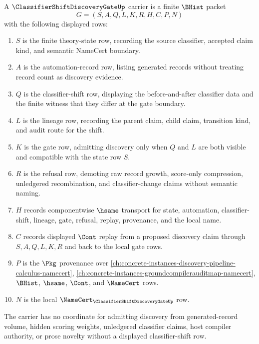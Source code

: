 \begin{definition}
\label{def:classifier-shift-discovery-gate-carrier}
A $\ClassifierShiftDiscoveryGateUp$ carrier is a finite $\BHist$ packet
$$
G=(S,A,Q,L,K,R,H,C,P,N)
$$
with the following displayed rows:
\begin{enumerate}
\item $S$ is the finite theory-state row, recording the source classifier, accepted claim kind, and semantic NameCert boundary.
\item $A$ is the automation-record row, listing generated records without treating record count as discovery evidence.
\item $Q$ is the classifier-shift row, displaying the before-and-after classifier data and the finite witness that they differ at the gate boundary.
\item $L$ is the lineage row, recording the parent claim, child claim, transition kind, and audit route for the shift.
\item $K$ is the gate row, admitting discovery only when $Q$ and $L$ are both visible and compatible with the state row $S$.
\item $R$ is the refusal row, demoting raw record growth, score-only compression, unledgered recombination, and classifier-change claims without semantic naming.
\item $H$ records componentwise $\hsame$ transport for state, automation, classifier-shift, lineage, gate, refusal, replay, provenance, and the local name.
\item $C$ records displayed $\Cont$ replay from a proposed discovery claim through $S,A,Q,L,K,R$ and back to the local gate rows.
\item $P$ is the $\Pkg$ provenance over \autoref{ch:concrete-instances-discovery-pipeline-calculus-namecert}, \autoref{ch:concrete-instances-groundcompilerauditmap-namecert}, $\BHist$, $\hsame$, $\Cont$, and $\NameCert$ rows.
\item $N$ is the local $\NameCert_{\ClassifierShiftDiscoveryGateUp}$ row.
\end{enumerate}
The carrier has no coordinate for admitting discovery from generated-record volume, hidden scoring weights, unledgered classifier claims, host compiler authority, or prose novelty without a displayed classifier-shift row.
\end{definition}

